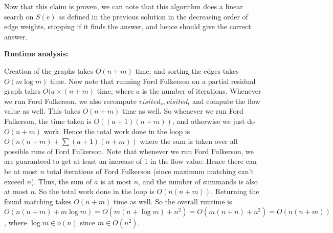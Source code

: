 \documentclass[answers]{exam}
\begin{document}
\begin{questions}
\begin{solution}
    Now that this claim is proven, we can note that this algorithm does a linear search on $S(e)$ as defined in the previous solution in the decreasing order of edge weights, stopping if it finds the
    answer, and hence should give the correct answer.

    \textbf{Runtime analysis:}

    Creation of the graphs takes $O(n + m)$ time, and sorting the edges takes $O(m \log m)$ time. Now note that running Ford Fulkerson on a partial residual graph takes $O(a \times (n + m)$ time,
    where $a$ is the number of iterations. Whenever we run Ford Fulkerson, we also recompute $visited_s, visited_t$ and compute the flow value as well. This takes $O(n + m)$ time as well. So
    whenever we run Ford Fulkerson, the time taken is $O((a + 1)(n + m))$, and otherwise we just do $O(n + m)$ work. Hence the total work done in the loop is $O(n (n + m) + \sum(a + 1)(n + m))$ where the sum is taken over
    all possible runs of Ford Fulkerson. Note that whenever we run Ford Fulkerson, we are guaranteed to get at least an increase of 1 in the flow value. Hence there can be at most $n$ total
    iterations of Ford Fulkerson (since maximum matching can't exceed $n$). Thus, the sum of $a$ is at most $n$, and the number of summands is also at most $n$. So the total work done in the loop is
    $O(n (n + m))$. Returning the found matching takes $O(n + m)$ time as well. So the overall runtime is $O(n(n + m) + m \log m) = O(m(n + \log m) + n^2) = O(m(n + n) + n^2) = O(n(n + m))$,
    where $\log m \in o(n)$ since $m \in O(n^2)$.

\end{solution}

\end{questions}
\end{document}
